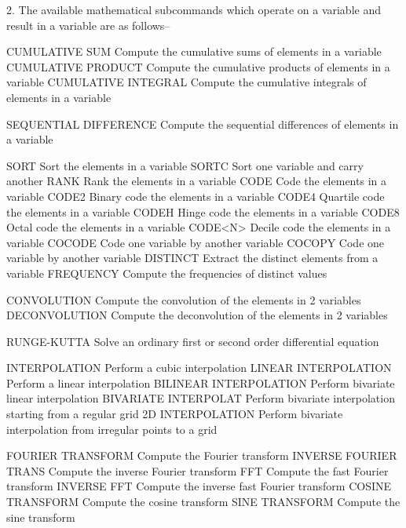 2. The available mathematical subcommands which operate on a variable
   and result in a variable are as follows--
 
      CUMULATIVE SUM         Compute the cumulative sums of elements in
                             a variable
      CUMULATIVE PRODUCT     Compute the cumulative products of
                             elements in a variable
      CUMULATIVE INTEGRAL    Compute the cumulative integrals of
                             elements in a variable
 
      SEQUENTIAL DIFFERENCE  Compute the sequential differences of
                             elements in a variable
 
      SORT                   Sort the elements in a variable
      SORTC                  Sort one variable and carry another
      RANK                   Rank the elements in a variable
      CODE                   Code the elements in a variable
      CODE2                  Binary code the elements in a variable
      CODE4                  Quartile code the elements in a variable
      CODEH                  Hinge code the elements in a variable
      CODE8                  Octal code the elements in a variable
      CODE<N>                Decile code the elements in a variable
      COCODE                 Code one variable by another variable
      COCOPY                 Code one variable by another variable
      DISTINCT               Extract the distinct elements from a
                             variable
      FREQUENCY              Compute the frequencies of distinct values
 
      CONVOLUTION            Compute the convolution of the elements in
                             2 variables
      DECONVOLUTION          Compute the deconvolution of the elements
                             in 2 variables
 
      RUNGE-KUTTA            Solve an ordinary first or second order
                             differential equation
 
      INTERPOLATION          Perform a cubic interpolation
      LINEAR INTERPOLATION   Perform a linear interpolation
      BILINEAR INTERPOLATION Perform bivariate linear interpolation
      BIVARIATE INTERPOLAT   Perform bivariate interpolation starting
                             from a regular grid
      2D INTERPOLATION       Perform bivariate interpolation from
                             irregular points to a grid
 
      FOURIER TRANSFORM      Compute the Fourier transform
      INVERSE FOURIER TRANS  Compute the inverse Fourier transform
      FFT                    Compute the fast Fourier transform
      INVERSE FFT            Compute the inverse fast Fourier transform
      COSINE TRANSFORM       Compute the cosine transform
      SINE TRANSFORM         Compute the sine transform
 

